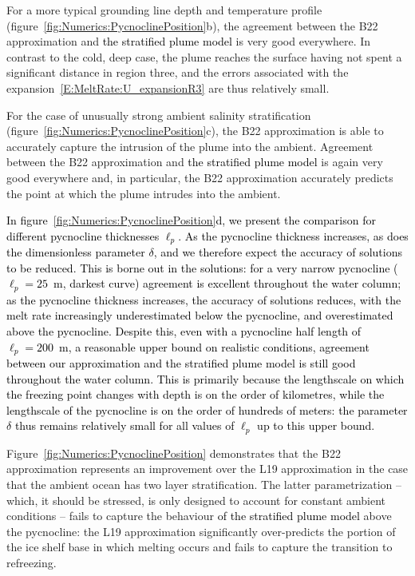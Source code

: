 \documentclass[openacc]{rsproca_new}%
\newcommand{\red}[1]{{\color{red} #1}}
\newcommand{\blue}[1]{{\color{blue} #1}}
\newcommand{\rout}[1]{\red{\st{#1}}}\newcommand{\ab}[1]{\textcolor{Green}{#1}}\newcommand{\about}[1]{\textcolor{Cyan}{\sout{#1}}}
\renewcommand{\rout}[1]{{}} %
\renewcommand{\blue}[1]{{\textcolor{black}{#1}}} %
\renewcommand{\red}[1]{{}} %
\newcommand{\lt}{\delta} %
\begin{document}
For a more typical grounding line depth and temperature profile (figure~\ref{fig:Numerics:PycnoclinePosition}b), the agreement between the B22 approximation and \blue{the stratified plume model}\rout{numerical solutions} is very good everywhere. In contrast to the cold, deep case, the plume reaches the surface having not spent a significant distance in region three, and the errors associated with the expansion~\eqref{E:MeltRate:U_expansionR3} are thus relatively small.

\rout{Finally, f}\blue{F}or the case of unusually strong ambient salinity stratification (figure~\ref{fig:Numerics:PycnoclinePosition}c), the B22 approximation is able to accurately capture the intrusion of the  plume into the ambient. Agreement between the B22 approximation and \blue{the stratified plume model}\rout{numerical solutions} is again very good everywhere and, in particular, the B22 approximation accurately predicts the point at which the plume intrudes into the ambient.

\blue{In figure~\ref{fig:Numerics:PycnoclinePosition}d, we present the comparison for different pycnocline thicknesses $\ell_p$. As the pycnocline thickness increases, as does the dimensionless parameter $\delta$, and we therefore expect the accuracy of solutions to be reduced. This is borne out in the solutions: for a very narrow pycnocline ($\ell_p = 25$~m, darkest curve) agreement is excellent throughout the water column; as the pycnocline thickness increases, the accuracy of solutions reduces, with the melt rate increasingly underestimated below the pycnocline, and overestimated above the pycnocline. Despite this, even with a pycnocline half length of $\ell_p = 200$~m, a reasonable upper bound on realistic conditions, agreement between our approximation and the stratified plume model is still good throughout the water column. This is primarily because the lengthscale on which the freezing point changes with depth is on the order of kilometres, while the lengthscale of the pycnocline is on the order of hundreds of meters: the parameter $\lt$ thus remains relatively small for all values of $\ell_p$ up to this upper bound.}

Figure~\ref{fig:Numerics:PycnoclinePosition} demonstrates that the B22 approximation represents an improvement over the L19 approximation in the case that the ambient ocean has two layer stratification. The latter parametrization -- which, it should be stressed, is only designed to account for constant ambient conditions -- fails to capture the behaviour \blue{of the stratified plume model} above the pycnocline: the L19 approximation significantly over-predicts the portion of the ice shelf base in which melting occurs and fails to capture the transition to refreezing.
\end{document}
